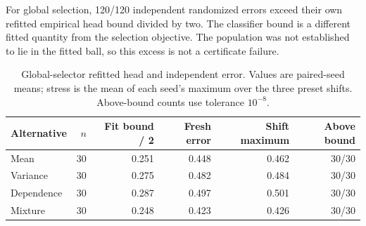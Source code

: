 \documentclass[11pt,a4paper]{article}
\begin{document}
For global selection, 120/120 independent randomized errors exceed their own refitted empirical head bound divided by two. The classifier bound is a different fitted quantity from the selection objective. The population was not established to lie in the fitted ball, so this excess is not a certificate failure.
\begin{table}[htbp]\centering\small\setlength{\tabcolsep}{3.5pt}
\caption{Global-selector refitted head and independent error. Values are paired-seed means; stress is the mean of each seed's maximum over the three preset shifts. Above-bound counts use tolerance $10^{-8}$.}\label{tab:head}
\begin{tabularx}{\linewidth}{@{}p{22mm}rrrrr@{}}
\toprule Alternative & $n$ & Fit bound / 2 & Fresh error & Shift maximum & Above bound \\
\midrule
Mean & 30 & 0.251 & 0.448 & 0.462 & 30/30 \\
Variance & 30 & 0.275 & 0.482 & 0.484 & 30/30 \\
Dependence & 30 & 0.287 & 0.497 & 0.501 & 30/30 \\
Mixture & 30 & 0.248 & 0.423 & 0.426 & 30/30 \\
\bottomrule\end{tabularx}\end{table}
\end{document}
